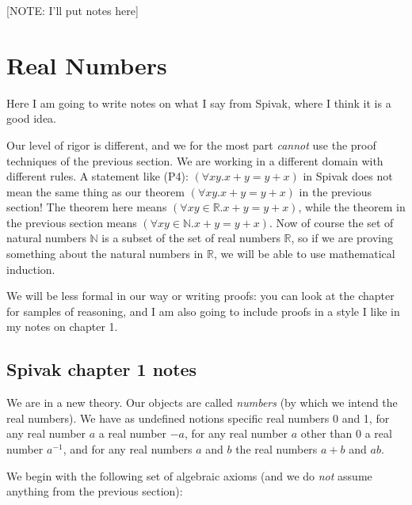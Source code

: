 \documentclass[12pt]{article}
\begin{document}
[NOTE:  I'll put notes here]

\section{Real Numbers}

Here I am going to write notes on what I say from Spivak, where I think it is a good idea.

Our level of rigor is different, and we for the most part {\em cannot\/} use the proof techniques of the previous section.  We are working in a different domain with different rules.  A statement like (P4):  $(\forall xy.x+y=y+x)$  in Spivak does not mean the same thing as our theorem $(\forall xy.x+y=y+x)$ in the previous section!  The theorem here means
$(\forall xy\in {\mathbb R}.x+y=y+x)$, while the theorem in the previous section means $(\forall xy\in {\mathbb N}.x+y=y+x)$.  Now of course the set of natural numbers $\mathbb N$ is a subset of the set of real numbers
$\mathbb R$, so if we are proving something about the natural numbers in $\mathbb R$, we will be able to use mathematical induction.

We will be less formal in our way or writing proofs:  you can look at the chapter for samples of reasoning, and I am also going to include proofs in a style I like in my notes on chapter 1.

\subsection{Spivak chapter 1 notes}

We are in a new theory.  Our objects are called {\em numbers\/} (by which we intend the real numbers).  We have as undefined notions specific real numbers 0 and 1, for any real number $a$ a real number $-a$, for any real number
$a$ other than 0 a real number $a^{-1}$, and for any real numbers $a$ and $b$ the real numbers $a+b$ and $ab$.

We begin with the following set of algebraic axioms (and we do {\em not\/} assume anything from the previous section):
\end{document}
